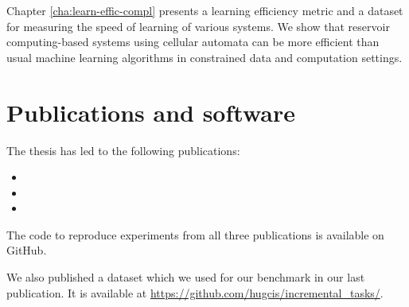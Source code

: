 Chapter \ref{cha:learn-effic-compl} presents a learning efficiency metric and a
dataset for measuring the speed of learning of various systems. We show that
reservoir computing-based systems using cellular automata can be more efficient
than usual machine learning algorithms in constrained data and computation
settings.


\section{Publications and software}

The thesis has led to the following publications:

\begin{itemize}
  \item {}
  \item {}
  \item {}
\end{itemize}

The code to reproduce experiments from all three publications is available on
GitHub.

We also published a dataset which we used for our benchmark in our last
publication. It is available at
\url{https://github.com/hugcis/incremental_tasks/}.

